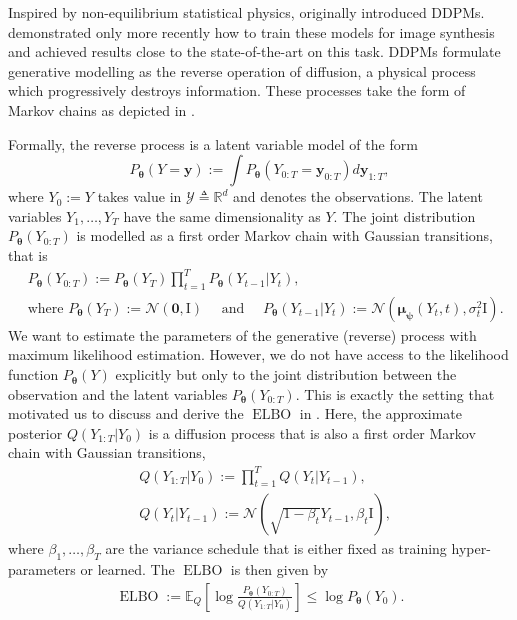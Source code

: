 Inspired by non-equilibrium statistical physics, \citet{sohl-dickstein_deep_2015} originally introduced DDPMs. \citet{ho_denoising_2020}  demonstrated only more recently how to train these models for image synthesis and achieved results close to the state-of-the-art on this task. DDPMs formulate generative modelling as the reverse operation of diffusion, a physical process which progressively destroys information. These processes take the form of Markov chains as depicted in .

Formally, the reverse process is a latent variable model of the form
$$P_{\bm{\theta}}(Y=\mathbf{y}) := \int P_{\bm{\theta}}(Y_{0:T} = \mathbf{y}_{0:T}) d\mathbf{y}_{1:T},$$
where $Y_0:=Y$ takes value in $\mathcal{Y} \triangleq \mathbb{R}^d$ and denotes the observations. The latent variables $Y_1, \dots, Y_T$ have the same dimensionality as $Y$. The joint distribution $P_{\bm{\theta}}(Y_{0:T})$ is modelled as a first order Markov chain with Gaussian transitions, that is
\begin{align}
    &P_{\bm{\theta}}(Y_{0:T}) := P_{\bm{\theta}}(Y_{T}) \prod^T_{t=1} P_{\bm{\theta}}(Y_{t-1}|Y_{t}),\\
    & \text{where } P_{\bm{\theta}}(Y_{T}) := \mathcal{N}(\mathbf{0}, \text{I}) \quad \text{ and } \quad P_{\bm{\theta}}(Y_{t-1}|Y_{t}) := \mathcal{N}(\mathbf{\mu_\psi}(Y_t, t), \sigma_t^2 \text{I}).
\end{align}
We want to estimate the parameters of the generative (reverse) process with maximum likelihood estimation. However, we do not have access to the likelihood function $P_{\bm{\theta}}(Y)$ explicitly but only to the joint distribution between the observation and the latent variables $P_{\bm{\theta}}(Y_{0:T})$. This is exactly the setting that motivated us to discuss and derive the $\operatorname{ELBO}$ in .
Here, the approximate posterior $Q(Y_{1:T}|Y_0)$ is a diffusion process that is also a first order Markov chain with Gaussian transitions,
\begin{align}
    &Q(Y_{1:T}|Y_0) := \prod^T_{t=1} Q(Y_{t}|Y_{t-1}),\\
    &Q(Y_{t}|Y_{t-1}) := \mathcal{N}(\sqrt{1-\beta_t} Y_{t-1}, \beta_t \text{I}),
\end{align}
where $\beta_1, \hdots, \beta_T$ are the variance schedule that is either fixed as training hyper-parameters or learned.
The $\operatorname{ELBO}$ is then given by
\begin{align}
    \operatorname{ELBO} := \mathbb{E}_Q\left[ \log \frac{P_{\bm{\theta}}(Y_{0:T})}{Q(Y_{1:T}|Y_0)} \right] \leq \log P_{\bm{\theta}}(Y_0). \label{eq:ELBO_DDPM}
\end{align}

